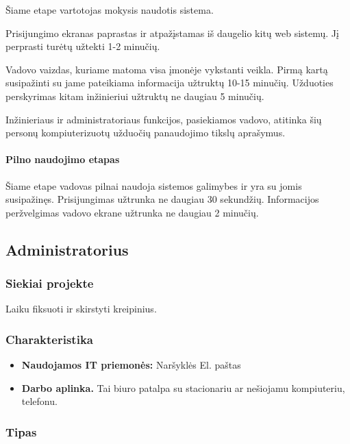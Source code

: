 			Šiame etape vartotojas mokysis naudotis sistema.
			
			Prisijungimo ekranas paprastas ir atpažįstamas iš daugelio kitų web sistemų.
			Jį perprasti turėtų užtekti 1-2 minučių.

			Vadovo vaizdas, kuriame matoma visa įmonėje vykstanti veikla.
			Pirmą kartą susipažinti su jame pateikiama informacija užtruktų 10-15 minučių.
			Užduoties perskyrimas kitam inžinieriui užtruktų ne daugiau 5 minučių.
						
			Inžinieriaus ir administratoriaus funkcijos, pasiekiamos vadovo, atitinka šių personų kompiuterizuotų užduočių panaudojimo tikslų aprašymus.
			
			\setcounter{tocdepth}{5} \setcounter{secnumdepth}{5}
			
			\paragraph{Pilno naudojimo etapas}
			
			Šiame etape vadovas pilnai naudoja sistemos galimybes ir yra su jomis susipažinęs.
			Prisijungimas užtrunka ne daugiau 30 sekundžių. Informacijos peržvelgimas vadovo ekrane užtrunka ne daugiau 2 minučių.
			
			
	
	\subsection{Administratorius}
	
		\subsubsection{Siekiai projekte}
		
		Laiku fiksuoti ir skirstyti kreipinius. 
		
		\subsubsection{Charakteristika}
		
		\begin{itemize}
			\item \textbf{Naudojamos IT priemonės:}
				\subitem Naršyklės
				\subitem El. paštas
			\item \textbf{Darbo aplinka.}
			Tai biuro patalpa su stacionariu ar nešiojamu kompiuteriu, telefonu.
		\end{itemize}
			
		\subsubsection{Tipas}
		
